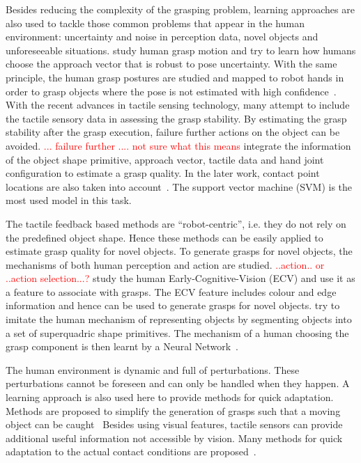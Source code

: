 Besides reducing the complexity of the grasping problem, learning approaches are also used to tackle those common problems that appear in the human environment: uncertainty and noise in perception data, novel objects and unforeseeable situations. \citet{ekvall2007learning,stulp2011learning} study human grasp motion and try to learn how humans choose the approach vector that is robust to pose uncertainty. With the same principle, the human grasp postures are studied and mapped to robot hands in order to grasp objects where the pose is not estimated with high confidence~\citep{tegin2009demonstration}. With the recent advances in tactile sensing technology, many attempt to include the tactile sensory data in assessing the grasp stability. By estimating the grasp stability after the grasp execution, failure further actions on the object can be avoided. 
\textcolor{red}{... failure further .... not sure what this means}
\citet{bekiroglu2011assessing} integrate the information of the object shape primitive, approach vector, tactile data and hand joint configuration to estimate a grasp quality.
In the later work, contact point locations are also taken into account~\citep{dang2012learning,dang2014stable}. The support vector machine (SVM) is the most used model in this task.

The tactile feedback based methods are ``robot-centric'', i.e. they do not rely on the predefined object shape. Hence these methods can be easily applied to estimate grasp quality for novel objects. To generate grasps for novel objects, the mechanisms of both human perception and action  are studied. 
\textcolor{red}{..action.. or ..action selection...?}
\citet{detry2009learning} study the human Early-Cognitive-Vision (ECV) and use it as a feature to associate with grasps. The ECV feature includes colour and edge information and hence can be used to generate grasps for novel objects.
\citet{el2007learning} try to imitate the human mechanism of representing objects by segmenting objects into a set of superquadric shape primitives. The mechanism of a human choosing the grasp component is then learnt by a Neural Network~\citep{el2010new}.



The human environment is dynamic and full of perturbations. These perturbations cannot be foreseen and can only be handled when they happen. A learning approach is also used here to provide methods for quick adaptation. Methods are proposed to simplify the generation of grasps such that a moving object can be caught~\citep{harada2008fast,kim2012,bidan2013grasp}
Besides using visual features, tactile sensors can provide additional useful information not accessible by vision. Many methods for quick adaptation to the actual contact conditions are proposed~\citep{hsiao2010contact,hsiao2011robust,kazemi2012robust,sauser2011iterative,li2014learning}.




